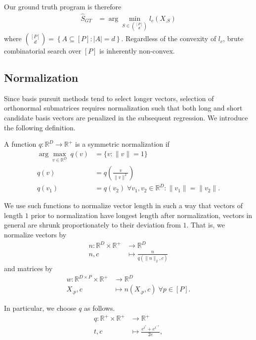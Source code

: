 Our ground truth program is therefore 
\begin{align}
\label{prog:ground_truth}
\widehat { S}_{GT}  &= \arg \min_{ S \in \binom{[P]}{d}} l_c ( X_{. S})
\end{align}
where $\binom{[P]}{d} = \left\{ A \subseteq [P] : \left|A\right| = d \right\}$.
Regardless of the convexity of $l_c$, brute combinatorial search over $[P]$ is inherently non-convex.

\subsection{Normalization}
\label{sec:normalization}

Since basis pursuit methods tend to select longer vectors, selection of orthonormal submatrices requires normalization such that both long and short candidate basis vectors are penalized in the subsequent regression.
We introduce the following definition.

\begin{definition}
A function $q: \mathbb R^D \to \mathbb R^+ $ is a symmetric normalization if 
\begin{align}
\arg \max_{v \in \mathbb R^D} \ q (v) &=\{ v : \|v\| = 1 \} \\
q(v) &= q(\frac{v}{\|v\|^2}) \\
q(v_1) &= q(v_2) \; \forall v_1, v_2 \in \mathbb R^D : \|v_1\| = \|v_2\|.
\end{align} \label{def:symmetric_normalization}
\end{definition}

We use such functions to normalize vector length in such a way that vectors of length $1$ prior to normalization have longest length after normalization, vectors in general are shrunk proportionately to their deviation from $1$. 
That is, we normalize vectors by 
\begin{align}
n: \mathbb R^D \times \mathbb R^+ &\to \mathbb R^D \\
n , c &\mapsto \frac{n}{q(\|n\|_{2},c) }
\end{align}
and matrices by
\begin{align}
w: \mathbb R^{D \times P} \times \mathbb R^+ &\to \mathbb R^D \\
 X_{.p} , c &\mapsto n( X_{.p}, c) \; \forall p \in [P].
\end{align}

In particular, we choose $q$ as follows.
\begin{align}
\label{eq:normalization}
q: \mathbb R^+ \times \mathbb R^+  &\to \mathbb R^+ \\
t , c &\mapsto \frac{e^{t^c} + e^{t^{-c}}}{2e},
\end{align}

